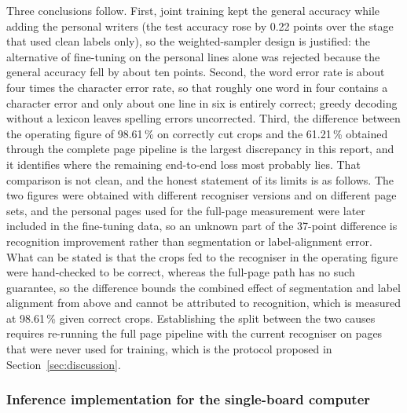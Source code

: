 Three conclusions follow.
First, joint training kept the general accuracy while adding the personal writers (the test accuracy rose by 0.22 points over the stage that used clean labels only), so the weighted-sampler design is justified: the alternative of fine-tuning on the personal lines alone was rejected because the general accuracy fell by about ten points.
Second, the word error rate is about four times the character error rate, so that roughly one word in four contains a character error and only about one line in six is entirely correct; greedy decoding without a lexicon leaves spelling errors uncorrected.
Third, the difference between the operating figure of 98.61\,\% on correctly cut crops and the 61.21\,\% obtained through the complete page pipeline is the largest discrepancy in this report, and it identifies where the remaining end-to-end loss most probably lies.
That comparison is not clean, and the honest statement of its limits is as follows.
The two figures were obtained with different recogniser versions and on different page sets, and the personal pages used for the full-page measurement were later included in the fine-tuning data, so an unknown part of the 37-point difference is recognition improvement rather than segmentation or label-alignment error.
What can be stated is that the crops fed to the recogniser in the operating figure were hand-checked to be correct, whereas the full-page path has no such guarantee, so the difference bounds the combined effect of segmentation and label alignment from above and cannot be attributed to recognition, which is measured at 98.61\,\% given correct crops.
Establishing the split between the two causes requires re-running the full page pipeline with the current recogniser on pages that were never used for training, which is the protocol proposed in Section~\ref{sec:discussion}.

\subsubsection{Inference implementation for the single-board computer}

